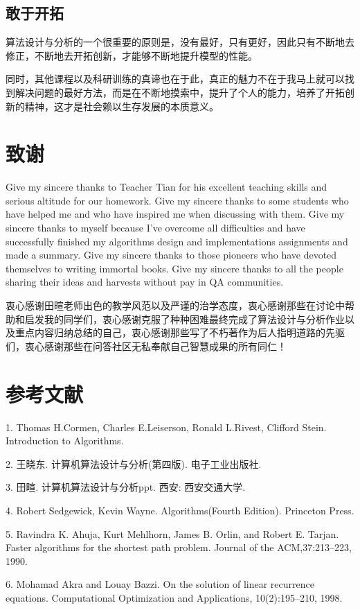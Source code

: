 \documentclass[UTF8]{ctexart}
\begin{document}
   	\subsection{敢于开拓}
   	算法设计与分析的一个很重要的原则是，没有最好，只有更好，因此只有不断地去修正，不断地去开拓创新，才能够不断地提升模型的性能。

   	同时，其他课程以及科研训练的真谛也在于此，真正的魅力不在于我马上就可以找到解决问题的最好方法，而是在不断地摸索中，提升了个人的能力，培养了开拓创新的精神，这才是社会赖以生存发展的本质意义。
    \section{致谢}
    Give my sincere thanks to Teacher Tian for his excellent teaching skills and serious altitude for our homework. Give my sincere thanks to some students who have helped me and who have inspired me when discussing with them. Give my sincere thanks to myself because I've overcome all difficulties and have successfully finished my algorithms design and implementations assignments and made a summary. Give my sincere thanks to those pioneers who have devoted themselves to writing immortal books. Give my sincere thanks to all the people sharing their ideas and harvests without pay in QA communities.

    衷心感谢田暄老师出色的教学风范以及严谨的治学态度，衷心感谢那些在讨论中帮助和启发我的同学们，衷心感谢克服了种种困难最终完成了算法设计与分析作业以及重点内容归纳总结的自己，衷心感谢那些写了不朽著作为后人指明道路的先驱们，衷心感谢那些在问答社区无私奉献自己智慧成果的所有同仁！

    \section{参考文献}
    1. Thomas H.Cormen, Charles E.Leiserson, Ronald L.Rivest, Clifford Stein. Introduction to Algorithms.

    2. 王晓东. 计算机算法设计与分析(第四版). 电子工业出版社.

    3. 田暄. 计算机算法设计与分析ppt. 西安: 西安交通大学.

    4. Robert Sedgewick, Kevin Wayne. Algorithms(Fourth Edition). Princeton Press.

    5. Ravindra K. Ahuja, Kurt Mehlhorn, James B. Orlin, and Robert E. Tarjan. Faster algorithms for the shortest path problem. Journal of the ACM,37:213–223, 1990.

    6. Mohamad Akra and Louay Bazzi. On the solution of linear recurrence equations. Computational Optimization and Applications, 10(2):195–210, 1998.
\end{document}
